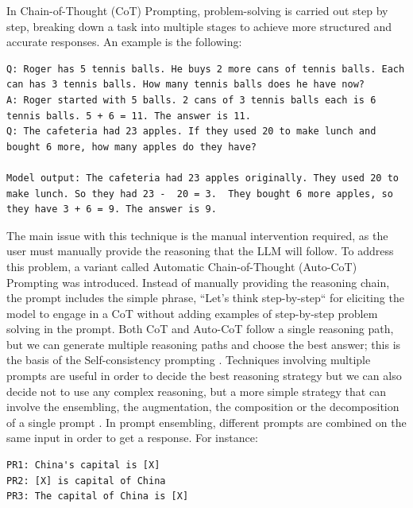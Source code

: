 In Chain-of-Thought (CoT) Prompting, problem-solving is carried out step by step, breaking down a task into multiple stages to achieve more structured and accurate responses.
An example is the following:
\begin{lstlisting}
Q: Roger has 5 tennis balls. He buys 2 more cans of tennis balls. Each can has 3 tennis balls. How many tennis balls does he have now? 
A: Roger started with 5 balls. 2 cans of 3 tennis balls each is 6 tennis balls. 5 + 6 = 11. The answer is 11.  
Q: The cafeteria had 23 apples. If they used 20 to make lunch and bought 6 more, how many apples do they have?

Model output: The cafeteria had 23 apples originally. They used 20 to make lunch. So they had 23 -  20 = 3.  They bought 6 more apples, so they have 3 + 6 = 9. The answer is 9.   
\end{lstlisting}
The main issue with this technique is the manual intervention required, as the user must manually provide the reasoning that the LLM will follow.
To address this problem, a variant called Automatic Chain-of-Thought (Auto-CoT) Prompting was introduced.
Instead of manually providing the reasoning chain, the prompt includes the simple phrase, ``Let's think step-by-step`` 
for eliciting the model to engage in a CoT without adding examples of step-by-step problem solving in the prompt.
Both CoT and Auto-CoT follow a single reasoning path, but we can generate multiple reasoning paths and choose the best answer; this is the basis of the Self-consistency prompting \cite{wang2022self}.
Techniques involving multiple prompts are useful in order to decide the best reasoning strategy but we can also decide not to use any complex reasoning, but a more simple strategy that can involve the ensembling, the augmentation, the composition or the decomposition of a single prompt \cite{liu2023pre}.
In prompt ensembling, different prompts are combined on the same input in order to get a response. For instance:
\begin{lstlisting}
PR1: China's capital is [X]
PR2: [X] is capital of China
PR3: The capital of China is [X]
\end{lstlisting}

